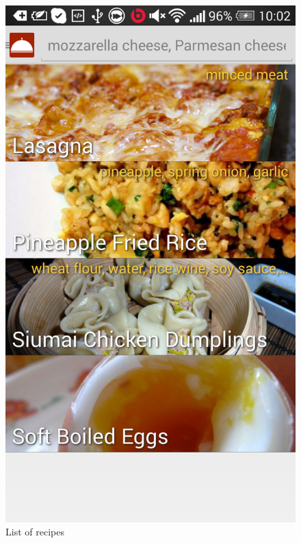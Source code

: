 \begin{figure}[H]
\begin{minipage}[t]{0.5\columnwidth}
\centering
\includegraphics[width=0.7\columnwidth]{img/screenshots/finallist.png}
\caption{List of recipes\label{fig:recipelist}}
\end{minipage}
\hspace{0.5cm}
\begin{minipage}[t]{0.5\columnwidth}
\centering

\end{minipage}
\end{figure}
